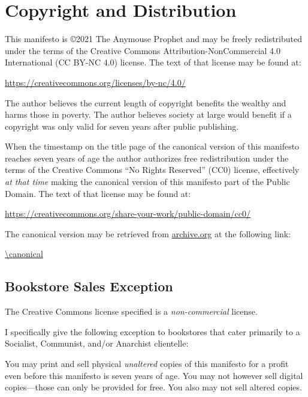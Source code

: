 \section{Copyright and Distribution}

This manifesto is \copyright 2021 The Anymouse Prophet and may be freely redistributed under the terms of the Creative Commons Attribution-NonCommercial 4.0 International (CC BY-NC 4.0) license. The text of that license may be found at:

\bigskip

\url{https://creativecommons.org/licenses/by-nc/4.0/}

\bigskip

\noindent The author believes the current length of copyright benefits the wealthy and harms those in poverty. The author believes society at large would benefit if a copyright was only valid for seven years after public publishing.

When the timestamp on the title page of the canonical version of this manifesto reaches seven years of age the author authorizes free redistribution under the terms of the Creative Commons ``No Rights Reserved'' (CC0) license, effectively \emph{at that time} making the canonical version of this manifesto part of the Public Domain. The text of that license may be found at:

\bigskip

\url{https://creativecommons.org/share-your-work/public-domain/cc0/}

\bigskip

\noindent The canonical version may be retrieved from \url{archive.org} at the following link:

\bigskip

\url{\canonical}

\subsection{Bookstore Sales Exception}

The Creative Commons license specified is a \emph{non-commercial} license.

I specifically give the following exception to bookstores that cater primarily to a Socialist, Communist, and/or Anarchist clientelle:

You may print and sell physical \emph{unaltered} copies of this manifesto for a profit even before this manifesto is seven years of age. You may not however sell digital copies---those can only be provided for free. You also may not sell altered copies.

